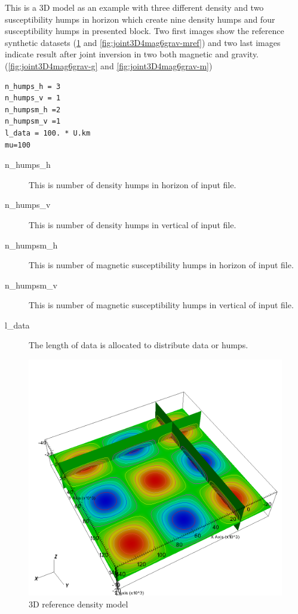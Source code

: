 This is a 3D model as an example with three different density and two susceptibility humps in horizon which create nine density humps and four susceptibility humps in presented block. Two first images show the reference synthetic datasets (\ref{fig:joint3D4mag6grav-gref} and \ref{fig:joint3D4mag6grav-mref}) and two last images indicate result after joint inversion in two both magnetic and gravity.(\ref{fig:joint3D4mag6grav-g} and \ref{fig:joint3D4mag6grav-m})
 
\begin{verbatim}
n_humps_h = 3
n_humps_v = 1
n_humpsm_h =2
n_humpsm_v =1
l_data = 100. * U.km
mu=100
\end{verbatim}

\begin{description} 	
\item[n_humps_h]This is number of density humps in horizon of input file.

\item[n_humps_v]This is number of density humps in vertical of input file.

\item[n_humpsm_h]This is number of magnetic susceptibility humps in horizon of input file.

\item[n_humpsm_v]This is number of magnetic susceptibility humps in vertical of input file.

\item[l_data]The length of data is allocated to distribute data or humps.

\end{description}


\begin{figure}
\centering
\includegraphics[width=\textwidth]{joint3D4mag6grav-gref.png}
\caption{3D reference density model}
\label{fig:joint3D4mag6grav-gref}
\end{figure}


